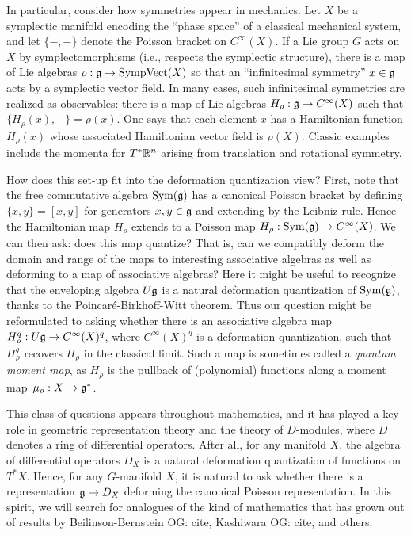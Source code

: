 \documentclass[11pt]{amsart}
\def\owen#1{{\textcolor{violet!65!black}{OG: {#1}}}}
\begin{document}
In particular, consider how symmetries appear in mechanics.
Let $X$ be a symplectic manifold encoding the ``phase space'' of a classical mechanical system,
and let $\{-,-\}$ denote the Poisson bracket on $C^\infty(X)$.
If a Lie group $G$ acts on $X$ by symplectomorphisms (i.e., respects the symplectic structure),
there is a map of Lie algebras $\rho: \mathfrak g \to {\rm SympVect}(X)$ so that an ``infinitesimal symmetry'' $x \in \mathfrak g$ acts by a symplectic vector field.
In many cases, such infinitesimal symmetries are realized as observables: 
there is a map of Lie algebras $H_\rho: \mathfrak g \to C^\infty(X)$ such that $\{ H_\rho(x), - \} = \rho(x)$.
One says that each element $x$ has a Hamiltonian function $H_\rho(x)$ whose associated Hamiltonian vector field is $\rho(X)$.
Classic examples include the momenta for $T^* \mathbb R^n$ arising from translation and rotational symmetry.

How does this set-up fit into the deformation quantization view?
First, note that the free commutative algebra $\operatorname{Sym}(\mathfrak g)$ has a canonical Poisson bracket by defining $ \{x, y \}   = [x, y]$ for generators $x, y \in \mathfrak g$ and extending by the Leibniz rule.
Hence the Hamiltonian map $H_\rho$ extends to a Poisson map $H_\rho: \operatorname{Sym}(\mathfrak g) \to C^\infty(X)$.
We can then ask: does this map quantize? That is, can we compatibly deform the domain and range of the maps to interesting associative algebras as well as deforming to a map of associative algebras?
Here it might be useful to recognize that the enveloping algebra $U\mathfrak g$ is a natural deformation quantization of $\operatorname{Sym}(\mathfrak g)$, thanks to the Poincar\'e-Birkhoff-Witt theorem.
Thus our question might be reformulated to asking whether there is an associative algebra map $H^q_\rho: U\mathfrak g \to C^\infty(X)^q$, where $C^\infty(X)^q$ is a deformation quantization, such that $H^q_\rho$ recovers $H_\rho$ in the classical limit.
Such a map is sometimes called a {\em quantum moment map},
as $H_\rho$ is the pullback of (polynomial) functions along a moment map~$\mu_\rho: X \to \mathfrak g^*$.

This class of questions appears throughout mathematics,
and it has played a key role in geometric representation theory and the theory of $D$-modules, where $D$ denotes a ring of differential operators.
After all, for any manifold $X$, the algebra of differential operators $D_X$ is a natural deformation quantization of functions on $T^* X$.
Hence, for any $G$-manifold $X$, it is natural to ask whether there is a representation $\mathfrak g \to D_X$ deforming the canonical Poisson representation.
In this spirit, we will search for analogues of the kind of mathematics that has grown out of results by Beilinson-Bernstein \owen{cite}, Kashiwara \owen{cite}, and others.
\end{document}
